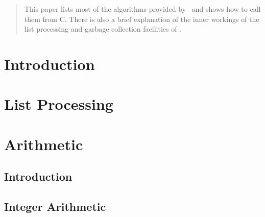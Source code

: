 \documentclass{report}
\begin{document}
\vfill

\begin{abstract}
This paper lists most of the algorithms provided by \saclib\ and shows how
to call them from C. There is also a brief explanation of the inner
workings of the list processing and garbage collection facilities of
\saclib.
\end{abstract}

\clearpage
{}
\tableofcontents
\clearpage
\listoffigures
\clearpage
{}


\chapter{Introduction}
\label{c:I}




\chapter{List Processing}
\label{c:LP}




\chapter{Arithmetic}
\label{c:A}

\section{Introduction}
\label{c:A s:I}



\section{Integer Arithmetic}
\label{c:A s:IA}
\end{document}
